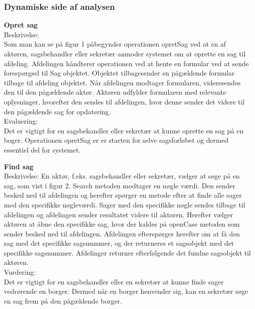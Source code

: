 \subsubsection{Dynamiske side af analysen}

\textbf{Opret sag}\\
Beskrivelse:\\
Som man kan se på figur 1 påbegynder operationen opretSag ved at en af aktøren, sagsbehandler eller sekretær anmoder systemet om at oprette en sag til afdeling. Afdelingen håndterer operationen ved at hente en formular ved at sende forespørgsel til Sag objektet. Objektet tilbagesender en pågældende formular tilbage til afdeling objektet. Når afdelingen modtager formularen, videresendes den til den pågældende aktør. Aktøren udfylder formularen med relevante oplysninger, hvorefter den sendes til afdelingen, hvor denne sender det videre til den pågældende sag for opdatering. \\
Evaluering:\\
Det er vigtigt for en sagsbehandler eller sekretær at kunne oprette en sag på en boger. Operationen opretSag er er starten for selve sagsforløbet og dermed essentiel del for systemet. 

\textbf{Find sag}\\
Beskrivelse:
En aktør, f.eks. sagsbehandler eller sekretær, vælger at søge på en sag, som vist i figur 2. Search metoden modtager en nøgle værdi. Den sender besked ned til afdelingen og herefter spørger en metode efter at finde alle sager med den specifikke nøgleværdi. Sager med den specifikke nøgle sendes tilbage til afdelingen og afdelingen sender resultatet videre til aktøren. Herefter vælger aktøren at åbne den specifikke sag, hvor der kaldes på openCase metoden som sender besked ned til afdelingen. Afdelingen efterspørger herefter om at få den sag med det specifikke sagsnummer, og der returneres et sagsobjekt med det specifikke sagsnummer. Afdelinger returner efterfølgende det fundne sagsobjekt til aktøren. \\
Vurdering:\\
Det er vigtigt for en sagsbehandler eller en sekretær at kunne finde sager vedrørende en borger. Dermed når en borger henvender sig, kan en sekretær søge en sag frem på den pågældende borger.  
